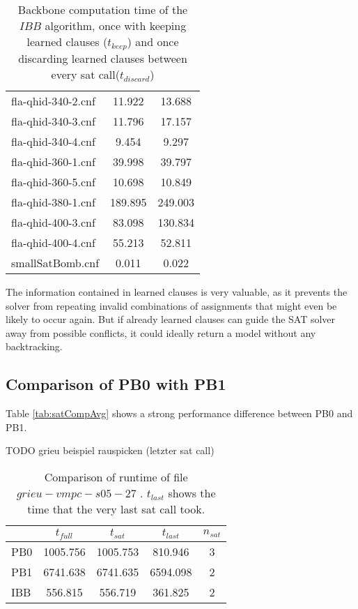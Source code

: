 \begin{wraptable}{R}{8cm}
\begin{tabular}{l| c c }
fla-qhid-340-2.cnf & 11.922 & 13.688 \\
fla-qhid-340-3.cnf & 11.796 & 17.157 \\
fla-qhid-340-4.cnf & 9.454 & 9.297 \\
fla-qhid-360-1.cnf & 39.998 & 39.797 \\
fla-qhid-360-5.cnf & 10.698 & 10.849 \\
fla-qhid-380-1.cnf & 189.895 & 249.003 \\
fla-qhid-400-3.cnf & 83.098 & 130.834 \\
fla-qhid-400-4.cnf & 55.213 & 52.811 \\
smallSatBomb.cnf & 0.011 & 0.022 \\
\end{tabular}
\caption{Backbone computation time of the $IBB$ algorithm, once with keeping learned clauses ($t_{keep}$) and once discarding learned clauses between every sat call($t_{discard}$)}
\label{tab:learnedIbb} %
\end{wraptable}

The information contained in learned clauses is very valuable, as it prevents the solver from repeating invalid combinations of assignments that might even be likely to occur again. But if already learned clauses can guide the SAT solver away from possible conflicts, it could ideally return a model without any backtracking.


\subsection{Comparison of PB0 with PB1}
Table \ref{tab:satCompAvg} shows a strong performance difference between PB0 and PB1.

TODO grieu beispiel rauspicken (letzter sat call)

\begin{wraptable}{R}{7cm} %
\begin{tabular}{l| c c c c}
& $t_{full}$ & $t_{sat}$ & $t_{last}$ & $n_{sat}$ \\
\hline			
PB0 & 1005.756 & 1005.753 & 810.946 & 3 \\
PB1 & 6741.638 & 6741.635 & 6594.098 & 2 \\
IBB & 556.815 & 556.719 & 361.825 & 2 \\
\end{tabular}
\caption{Comparison of runtime of file $grieu-vmpc-s05-27$ . $t_{last}$ shows the time that the very last sat call took.}
\label{tab:tLastGrieu} %
\end{wraptable}

